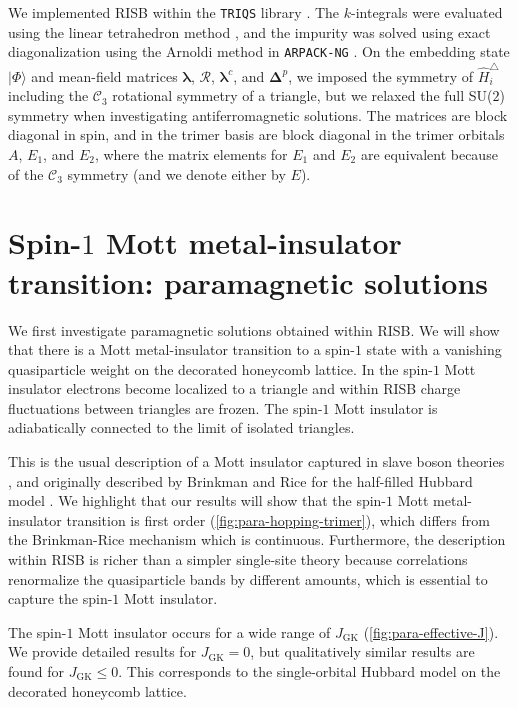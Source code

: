 \documentclass[reprint,aps,prb,amsmath,amssymb]{revtex4-2}
\begin{document}
We implemented RISB within the \verb+TRIQS+ library \cite{Parcollet2015,Seth2016}. The $k$-integrals were evaluated using the linear tetrahedron method \cite{Blochl1994}, and the impurity was solved using exact diagonalization using the Arnoldi method in \verb+ARPACK-NG+ \cite{TRIQS-ARPACK}. On the embedding state $|\Phi\rangle$ and mean-field matrices $\bm{\lambda}$, $\bm{\mathcal{R}}$, $\bm{\lambda}^c$, and $\bm{\Delta}^p$, we imposed the symmetry of $\hat{H}_i^{\triangle}$ including the $\mathcal{C}_3$ rotational symmetry of a triangle, but we relaxed the full SU($2$) symmetry when investigating antiferromagnetic solutions. The matrices are block diagonal in spin, and in the trimer basis are block diagonal in the trimer orbitals $A$, $E_1$, and $E_2$, where the matrix elements for $E_1$ and $E_2$ are equivalent because of the $\mathcal{C}_3$ symmetry (and we denote either by $E$).

\section{Spin-$1$ Mott metal-insulator transition: paramagnetic solutions} \label{sec:para}

We first investigate paramagnetic solutions obtained within RISB. We will show that there is a Mott metal-insulator transition to a spin-$1$ state with a vanishing quasiparticle weight on the decorated honeycomb lattice. In the spin-$1$ Mott insulator electrons become localized to a triangle and within RISB charge fluctuations between triangles are frozen. The spin-$1$ Mott insulator is adiabatically connected to the limit of isolated triangles.

This is the usual description of a Mott insulator captured in slave boson theories \cite{Kotliar1986}, and originally described by Brinkman and Rice for the half-filled Hubbard model \cite{Brinkman1970}. We highlight that our results will show that the spin-$1$ Mott metal-insulator transition is first order (\cref{fig:para-hopping-trimer}), which differs from the Brinkman-Rice mechanism which is continuous. Furthermore, the description within RISB is richer than a simpler single-site theory because correlations renormalize the quasiparticle bands by different amounts, which is essential to capture the spin-$1$ Mott insulator.

The spin-$1$ Mott insulator occurs for a wide range of $J_{\mathrm{GK}}$ (\cref{fig:para-effective-J}). We provide detailed results for $J_{\mathrm{GK}} = 0$, but qualitatively similar results are found for $J_{\mathrm{GK}} \le 0$. This corresponds to the single-orbital Hubbard model on the decorated honeycomb lattice.
\end{document}
